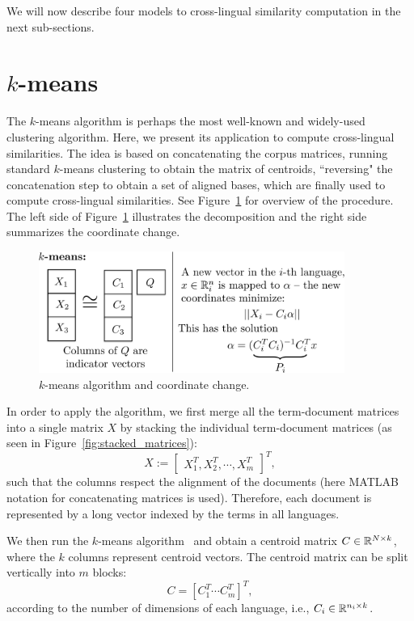 We will now describe four models to cross-lingual similarity computation in the next sub-sections.
\section{$k$-means}\label{sec:kmeans}

The $k$-means algorithm is perhaps the most well-known and widely-used clustering algorithm. Here, we 
present its application to compute cross-lingual similarities. The idea is based on concatenating 
the corpus matrices, running standard $k$-means clustering to obtain the matrix of centroids, ``reversing" the 
concatenation step to obtain a set of aligned bases, which are finally used to compute cross-lingual 
similarities. See Figure~\ref{fig:kmeans} for overview of the procedure. The left side of Figure~\ref{fig:kmeans} 
illustrates the decomposition and the right side summarizes the coordinate change.

\begin{figure}[tbp]
\centering
\includegraphics[width=10cm]{figures/kmeans.pdf}
\caption{\label{fig:kmeans} $k$-means algorithm and coordinate change.}
\end{figure}

 In order to apply the algorithm, we first merge all the term-document matrices into a single matrix 
 $X$ by stacking the individual term-document matrices (as seen in Figure~\ref{fig:stacked_matrices}):
$$X := \begin{bmatrix}X_1^T ,X_2^T, \cdots, X_m^T \end{bmatrix}^T,$$
such that the columns respect the alignment of the documents (here MATLAB notation for concatenating 
matrices is used). Therefore, each document  is represented by a long vector indexed by the terms in all languages.

We then run the $k$-means algorithm~\cite{kmeans} and obtain a centroid matrix $C \in \mathbb{R}^{N \times k}$, 
where the $k$ columns represent centroid vectors. The centroid matrix can be split vertically into $m$ 
blocks: $$C = [C_1^T \cdots C_m^T]^T,$$ according to the number of dimensions of each language, 
i.e., $C_i \in \mathbb{R}^{n_i \times k}$.

